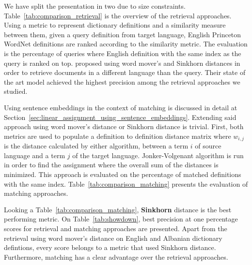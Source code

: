 We have split the presentation in two due to size constraints.
Table~\ref{tab:comparison_retrieval} is the overview of the retrieval approaches.
Using a metric to represent dictionary definitions and a similarity measure between them, given a query definition from target language, English Princeton WordNet definitions are ranked according to the similarity metric.
The evaluation is the percentage of queries where English definition with the same index as the query is ranked on top.
\textcite{balikas_cross-lingual_2018} proposed using word mover's and Sinkhorn distances in order to retrieve documents in a different language than the query.
Their state of the art model achieved the highest precision among the retrieval approaches we studied.

Using sentence embeddings in the context of matching is discussed in detail at Section~\ref{sec:linear_assignment_using_sentence_embeddings}.
Extending said approach using word mover's distance or Sinkhorn distance is trivial.
First, both metrics are used to populate a definition to definition distance matrix where $w_{i,j}$ is the distance calculated by either algorithm, between a term $i$ of source language and a term $j$ of the target language.
Jonker-Volgenant algorithm is run in order to find the assignment where the overall sum of the distances is minimized.
This approach is evaluated on the percentage of matched definitions with the same index.
Table~\ref{tab:comparison_matching} presents the evaluation of matching approaches.

Looking a Table~\ref{tab:comparison_matching}, \textbf{Sinkhorn} distance is the best performing metric.
On Table~\ref{tab:showdown}, best precision at one percentage scores for retrieval and matching approaches are presented.
Apart from the retrieval using word mover's distance on English and Albanian dictionary defintions, every score belongs to a metric that used Sinkhorn distance.
Furthermore, matching has a clear advantage over the retrieval approaches.

